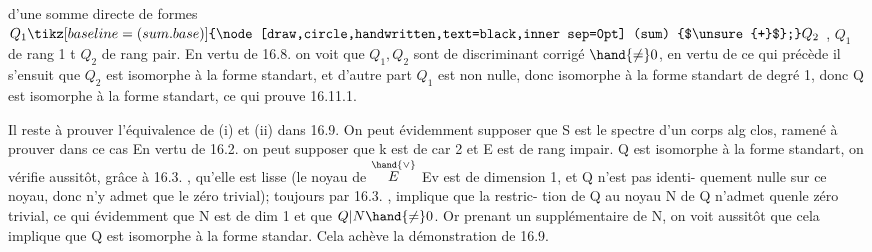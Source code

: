 
d'une somme directe de formes $Q_1 \tikz[baseline=(sum.base)]{\node[draw,circle,handwritten,text=black,inner sep=0pt] (sum) {$\unsure{+}$};} Q_2$ , $Q_1$ de rang 1 t $Q_2$ de rang pair.
En vertu de 16.8. on voit que $Q_1,Q_2$ sont de discriminant corrigé
$\hand{\neq} 0$, en vertu de ce qui précède il s'ensuit que $Q_2$ est isomorphe à la
forme standart, et d'autre part $Q_1$ est non nulle, donc isomorphe à la
forme standart de degré 1, donc Q est isomorphe à la forme standart, ce
qui prouve 16.11.1.

Il reste à prouver l'équivalence de (i) et (ii) dans 16.9. On peut
évidemment supposer que S est le spectre d'un corps alg clos,  
ramené à prouver dans ce cas 
En vertu de 16.2. on peut supposer que k est de car 2 et E est de rang
impair. 
  Q est isomorphe à la forme
standart,  on vérifie aussitôt, grâce à 16.3. , qu'elle
est lisse (le noyau de $\overset{\hand{\vee}}{E}$ \hand{$\longrightarrow$}Ev est de dimension 1, et Q n'est pas identi-%
quement nulle sur ce noyau, donc n'y admet que le zéro trivial); 
  toujours par 16.3. ,   implique que  la restric-%
tion de Q au noyau N de Q n'admet quenle zéro trivial, ce qui évidemment
  que N est de dim 1 et que $Q|N \hand{\neq} 0$. Or prenant un supplémentaire
de N, on voit aussitôt que cela implique que Q est isomorphe à la forme
standar\hand{/}. Cela  achève la démonstration de 16.9.

